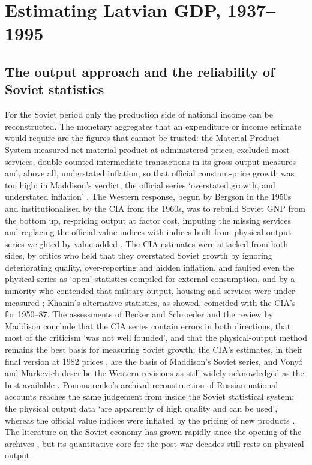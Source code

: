 \section{Estimating Latvian GDP, 1937--1995}
\label{sec:method}

\subsection{The output approach and the reliability of Soviet statistics}

For the Soviet period only the production side of national income can be reconstructed. The monetary aggregates that an expenditure or income estimate would require are the figures that cannot be trusted: the Material Product System measured net material product at administered prices, excluded most services, double-counted intermediate transactions in its gross-output measures and, above all, understated inflation, so that official constant-price growth was too high; in Maddison's verdict, the official series `overstated growth, and understated inflation' \parencite[307]{Maddison1998b}. The Western response, begun by Bergson in the 1950s and institutionalised by the CIA from the 1960s, was to rebuild Soviet GNP from the bottom up, re-pricing output at factor cost, imputing the missing services and replacing the official value indices with indices built from physical output series weighted by value-added \parencite{bergson1950,bergson1961,cia1982a}. The CIA estimates were attacked from both sides, by critics who held that they overstated Soviet growth by ignoring deteriorating quality, over-reporting and hidden inflation, and faulted even the physical series as `open' statistics compiled for external consumption, and by a minority who contended that military output, housing and services were under-measured \parencite{assessingCIA1988,becker1994,schroeder1995}; Khanin's alternative statistics, as \textcite[144, 159]{harrison1993} showed, coincided with the CIA's for 1950--87. The assessments of Becker and Schroeder and the review by Maddison conclude that the CIA series contain errors in both directions, that most of the criticism `was not well founded', and that the physical-output method remains the best basis for measuring Soviet growth; the CIA's estimates, in their final version at 1982 prices \parencite{cia1990}, are the basis of Maddison's Soviet series, and Vonyó and Markevich describe the Western revisions as still widely acknowledged as the best available \parencites[309]{Maddison1998b}[280]{vonyoinmorys2021}. Ponomarenko's archival reconstruction of Russian national accounts reaches the same judgement from inside the Soviet statistical system: the physical output data `are apparently of high quality and can be used', whereas the official value indices were inflated by the pricing of new products \parencite[16--18, 73--4]{ponomarenko2002}. The literature on the Soviet economy has grown rapidly since the opening of the archives \parencite{zhuravskaya2024}, but its quantitative core for the post-war decades still rests on physical output 